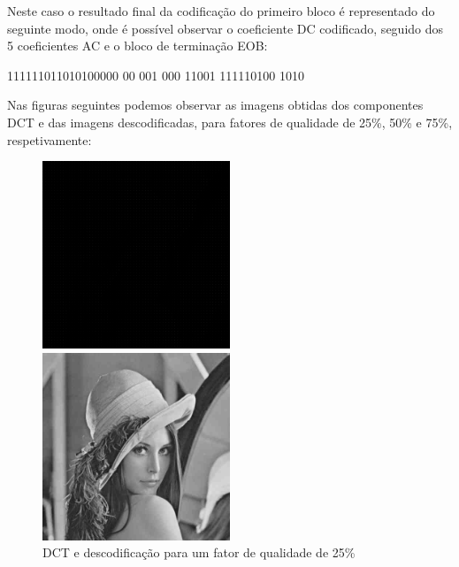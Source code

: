\documentclass[12pt,a4paper]{article}
\begin{document}
Neste caso o resultado final da codificação do primeiro bloco é representado do seguinte modo, onde é possível observar o coeficiente DC codificado, seguido dos 5 coeficientes AC e o bloco de terminação EOB:\\
\begin{center}
111111011010100000 00 001 000 11001 111110100 1010
\end{center}
\newpage
Nas figuras seguintes podemos observar as imagens obtidas dos componentes DCT e das imagens descodificadas, para fatores de qualidade de 25\%, 50\% e 75\%, respetivamente:

\begin{figure}[h]
	\centering
    \begin{minipage}{0.50\textwidth}
        \centering
        \includegraphics[width=0.5\textwidth]{imagens/ex7/DCT25.png}
    \end{minipage}\hfill
    \begin{minipage}{0.50\textwidth}
        \centering
        \includegraphics[width=0.5\textwidth]{imagens/ex7/IDCT25.png}
    \end{minipage}
    \caption{DCT e descodificação para um fator de qualidade de 25\%}
\end{figure}
\end{document}
